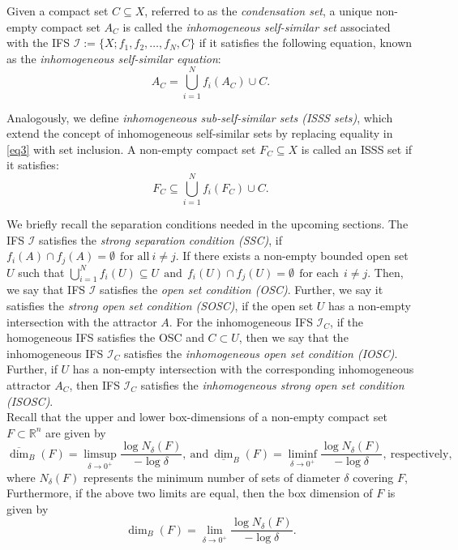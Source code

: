 \documentclass[12pt,oneside,reqno]{amsart}
\theoremstyle{definition}
\theoremstyle{remark}
\begin{document}
Given a compact set $C \subseteq X$, referred to as the \emph{condensation set}, a unique non-empty compact set $A_C$ is called the \emph{inhomogeneous self-similar set} associated with the IFS $\mathcal{I} := \{X; f_1, f_2, \dots, f_N, C\}$ if it satisfies the following equation, known as the \emph{inhomogeneous self-similar equation}:
\begin{equation}\label{eq3}
A_C = \bigcup_{i=1}^N f_i(A_C) \cup C.
\end{equation}

Analogously, we define \emph{inhomogeneous sub-self-similar sets (ISSS sets)}, which extend the concept of inhomogeneous self-similar sets by replacing equality in \eqref{eq3} with set inclusion. A non-empty compact set $F_C \subseteq X$ is called an ISSS set if it satisfies:
\begin{equation}\label{eq4}
F_C \subseteq \bigcup_{i=1}^N f_i(F_C) \cup C.
\end{equation}

We briefly recall the separation conditions needed in the upcoming sections. The IFS $\mathcal{I}$ satisfies the \emph{strong separation condition (SSC)}, if 
$f_{i}(A) \cap f_j(A) = \emptyset ~~ \text{for all} ~ i \neq j.$
If there exists a non-empty bounded open set $U$ such that 
$\bigcup_{i=1}^N f_i(U) \subseteq U ~~ \text{and}~~ f_i(U) \cap f_j(U)= \emptyset ~~\text{for each}~~ i \neq j.$
Then, we say that IFS $\mathcal{I}$ satisfies the \emph{open set condition (OSC)}. Further, we say it satisfies the \emph{strong open set condition (SOSC)}, if the open set $U$ has a non-empty intersection with the attractor $A$. 
For the inhomogeneous IFS $\mathcal{I}_C$, if the homogeneous IFS satisfies the OSC and $C \subset U$, then we say that the inhomogeneous IFS $\mathcal{I}_C$ satisfies the \emph{inhomogeneous open set condition (IOSC)}. Further, if $U$ has a non-empty intersection with the corresponding inhomogeneous attractor $A_C$, then IFS $\mathcal{I}_C$ satisfies the \emph{inhomogeneous strong open set condition (ISOSC)}.\\



Recall that the upper and lower box-dimensions of a non-empty compact set $F \subset \mathbb{R}^n$ are given by
 $$\overline{\dim}_{B}(F) = \limsup_{\delta \to 0^+ } \frac{\log N_{\delta}(F)}{-\log \delta}, ~\text{and} ~\underline{\dim}_{B}(F) = \liminf_{\delta \to 0^+ } \frac{\log N_{\delta}(F)}{-\log \delta}, ~\text{respectively},$$
 where $N_{\delta}(F)$ represents the minimum number of sets of diameter $\delta$ covering $F$,
Furthermore, if the above two limits are equal, then the box dimension of $F$ is given by 
$${\dim}_{B}(F) = \lim_{\delta \to 0^+ } \frac{\log N_{\delta}(F)}{-\log \delta}.$$
\end{document}
